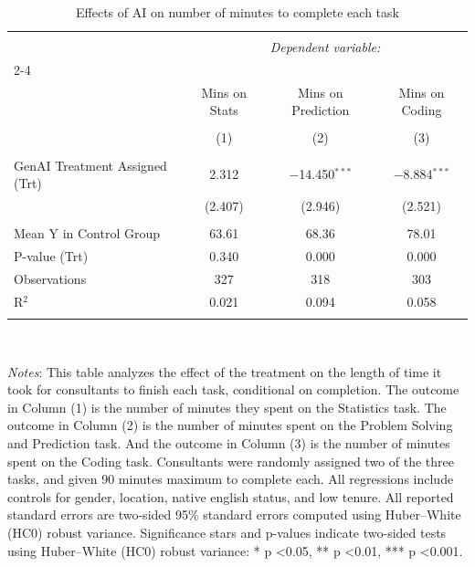 
\begin{table}[!htbp] \centering 
  \caption{Effects of AI on number of minutes to complete each task} 
  \label{tab:time} 
\small 
\begin{tabular}{@{\extracolsep{5pt}}lccc} 
\\[-1.8ex]\hline 
\hline \\[-1.8ex] 
 & \multicolumn{3}{c}{\textit{Dependent variable:}} \\ 
\cline{2-4} 
\\[-1.8ex] & Mins on Stats & Mins on Prediction & Mins on Coding \\ 
\\[-1.8ex] & (1) & (2) & (3)\\ 
\hline \\[-1.8ex] 
 GenAI Treatment Assigned (Trt) & 2.312 & $-$14.450$^{***}$ & $-$8.884$^{***}$ \\ 
  & (2.407) & (2.946) & (2.521) \\ 
 \hline \\[-1.8ex] 
Mean Y in Control Group & 63.61 & 68.36 & 78.01 \\ 
P-value (Trt) & 0.340 & 0.000 & 0.000 \\ 
Observations & 327 & 318 & 303 \\ 
R$^{2}$ & 0.021 & 0.094 & 0.058 \\ 
\hline 
\hline \\[-1.8ex] 
\end{tabular}
\\
\begin{minipage}{\textwidth}
{\footnotesize \emph{Notes}: This table analyzes the effect of the treatment on the length of time it took for consultants to finish each task, conditional on completion. The outcome in Column (1) is the number of minutes they spent on the Statistics task. The outcome in Column (2) is the number of minutes spent on the Problem Solving and Prediction task. And the outcome in Column (3) is the number of minutes spent on the Coding task. Consultants were randomly assigned two of the three tasks, and given 90 minutes maximum to complete each. All regressions include controls for gender, location, native english status, and low tenure. All reported standard errors are two-sided 95\% standard errors computed using Huber--White (HC0) robust variance. Significance stars and p-values indicate two-sided tests using Huber--White (HC0) robust variance: * p \textless 0.05, ** p \textless 0.01, *** p \textless 0.001.}
\end{minipage}
\end{table}
